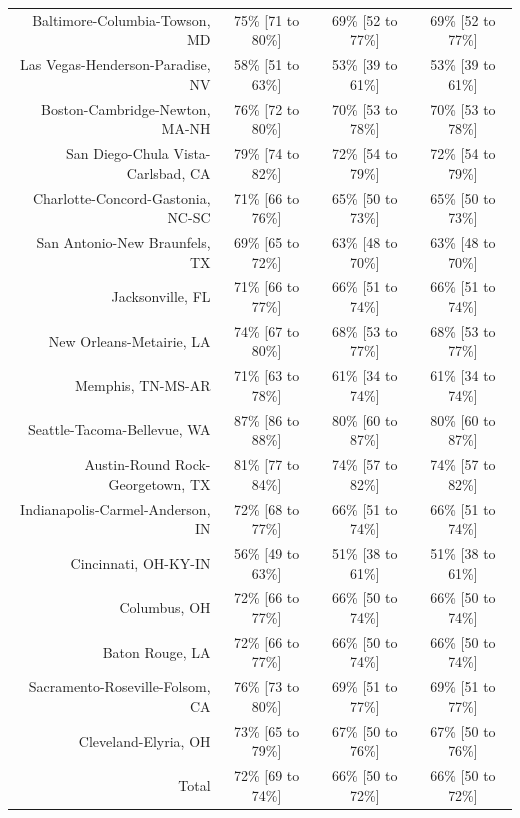 \documentclass{article}
\begin{document}
\begin{table}[H]
\begin{tabular}{|r|c|c|c|}
		Baltimore-Columbia-Towson, MD & 75\% [71 to 80\%] & 69\% [52 to 77\%] & 69\% [52 to 77\%]\\
		Las Vegas-Henderson-Paradise, NV & 58\% [51 to 63\%] & 53\% [39 to 61\%] & 53\% [39 to 61\%]\\
		Boston-Cambridge-Newton, MA-NH & 76\% [72 to 80\%] & 70\% [53 to 78\%] & 70\% [53 to 78\%]\\
		San Diego-Chula Vista-Carlsbad, CA & 79\% [74 to 82\%] & 72\% [54 to 79\%] & 72\% [54 to 79\%]\\
		Charlotte-Concord-Gastonia, NC-SC & 71\% [66 to 76\%] & 65\% [50 to 73\%] & 65\% [50 to 73\%]\\
		San Antonio-New Braunfels, TX & 69\% [65 to 72\%] & 63\% [48 to 70\%] & 63\% [48 to 70\%]\\
		Jacksonville, FL & 71\% [66 to 77\%] & 66\% [51 to 74\%] & 66\% [51 to 74\%]\\
		New Orleans-Metairie, LA & 74\% [67 to 80\%] & 68\% [53 to 77\%] & 68\% [53 to 77\%]\\
		Memphis, TN-MS-AR & 71\% [63 to 78\%] & 61\% [34 to 74\%] & 61\% [34 to 74\%]\\
		Seattle-Tacoma-Bellevue, WA & 87\% [86 to 88\%] & 80\% [60 to 87\%] & 80\% [60 to 87\%]\\
		Austin-Round Rock-Georgetown, TX & 81\% [77 to 84\%] & 74\% [57 to 82\%] & 74\% [57 to 82\%]\\
		Indianapolis-Carmel-Anderson, IN & 72\% [68 to 77\%] & 66\% [51 to 74\%] & 66\% [51 to 74\%]\\
		Cincinnati, OH-KY-IN & 56\% [49 to 63\%] & 51\% [38 to 61\%] & 51\% [38 to 61\%]\\
		Columbus, OH & 72\% [66 to 77\%] & 66\% [50 to 74\%] & 66\% [50 to 74\%]\\
		Baton Rouge, LA & 72\% [66 to 77\%] & 66\% [50 to 74\%] & 66\% [50 to 74\%]\\
		Sacramento-Roseville-Folsom, CA & 76\% [73 to 80\%] & 69\% [51 to 77\%] & 69\% [51 to 77\%]\\
		Cleveland-Elyria, OH & 73\% [65 to 79\%] & 67\% [50 to 76\%] & 67\% [50 to 76\%]\\
		\hline
		Total & 72\% [69 to 74\%] & 66\% [50 to 72\%] & 66\% [50 to 72\%]\\
		\hline
	\end{tabular}
\end{table}
\end{document}

